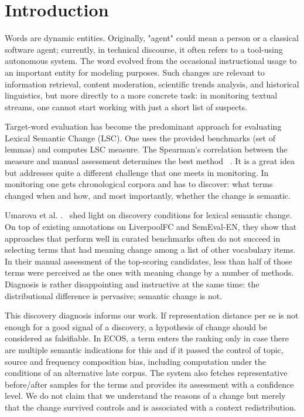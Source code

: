\documentclass{llncs}
\begin{document}
\section{Introduction}
\label{sec:intro}

Words are dynamic entities. Originally, "agent" could mean a person or a classical software agent; currently, in technical discourse, it often refers to a tool-using autonomous system. The word evolved from the occasional instructional usage to an important entity for modeling purposes. Such changes are relevant to information retrieval, content moderation, scientific trends analysis, and historical linguistics, but more directly to a more concrete task: in monitoring textual streams, one cannot start working with just a short list of suspects.


Target-word evaluation has become the predominant approach for evaluating Lexical Semantic Change (LSC). One uses the provided benchmarks (set of lemmas) and computes LSC measure. The Spearman's correlation between the measure and manual assessment determines the best method ~\cite{schlechtweg2020semeval,tahmasebi2021survey}. It is a great idea but addresses quite a different challenge that one meets in monitoring. In monitoring one gets chronological corpora and has to discover: what terms changed when and how, and most importantly, whether the change is semantic.

Umarova et al. .~\cite{umarova2025discovery} shed light on discovery conditions for lexical semantic change. On top of existing annotations on LiverpoolFC and SemEval-EN, they show that approaches that perform well in curated benchmarks often do not succeed in selecting terms that had meaning change among a list of other vocabulary items. In their manual assessment of the top-scoring candidates, less than half of those terms were perceived as the ones with meaning change by a number of methods. Diagnosis is rather disappointing and instructive at the same time: the distributional difference is pervasive; semantic change is not.

This discovery diagnosis informs our work. If representation distance per se is not enough for a good signal of a discovery, a hypothesis of change should be considered as falsifiable. In ECOS, a term enters the ranking only in case there are multiple semantic indications for this and if it passed the control of topic, source and frequency composition bias, including computation under the conditions of an alternative late corpus. The system also fetches representative before/after samples for the terms and provides its assessment with a confidence level. We do not claim that we understand the reasons of a change but merely that the change survived controls and is associated with a context redistribution.
\end{document}
